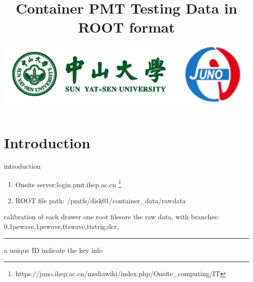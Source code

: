 \documentclass[11pt,compress,xcolor=x11names,UTF8]{beamer}
\title{Container PMT Testing Data in ROOT format}
\author[Rong. Zhao]{Email：zhaor25@mail2.sysu.edu.cn \and  } %
\institute[Sun Yat-Sen University]{School of Physics\and } %
\date[\today]{\includegraphics[width=.5\textwidth]{logo}}
\begin{document}
\maketitle


\section{Introduction}


%
\begin{frame}{ introduction }
	\begin{enumerate}
		\item Onsite server:login.pmt.ihep.ac.cn  \footnote{https://juno.ihep.ac.cn/mediawiki/index.php/Onsite\_computing/IT}
		\item ROOT file path: /pmtfs/disk01/container\_data/rawdata 
	\end{enumerate}
\end{frame}
\begin{frame}{calibration of each drawer}
one root filesore the raw data, with branches: 0.1pewave,1pewave,ttswave,ttstrig,dcr,
\vspace{.5cm}
\hrule{\textwidth}
\vspace{.5cm}
a unique ID indicate the key info
\vspace{.5cm}
\end{frame}
\end{document}
